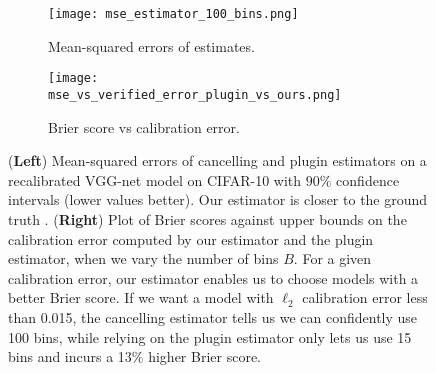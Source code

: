 \begin{figure}
  \centering
  \centering
     \begin{subfigure}[b]{0.45\textwidth}
         \centering
         \texttt{[image: mse\_estimator\_100\_bins.png]}
         \caption{Mean-squared errors of estimates.
         }
         \label{fig:mse_estimators}
     \end{subfigure}
     \hfill
     \begin{subfigure}[b]{0.45\textwidth}
         \centering
         \texttt{[image: mse\_vs\_verified\_error\_plugin\_vs\_ours.png]}
         \caption{Brier score vs calibration error.
         }
         \label{fig:mse_vs_ce_estimators}
     \end{subfigure}
  \caption{
    (\textbf{Left}) Mean-squared errors of cancelling and plugin estimators on a recalibrated VGG-net model on CIFAR-10 with $90\%$ confidence intervals (lower values better). Our estimator is closer to the ground truth .
  (\textbf{Right}) Plot of Brier scores against upper bounds  on the calibration error computed by our estimator and the plugin estimator, when we vary the number of bins $B$. For a given calibration error, our estimator enables us to choose models with a better Brier score. If we want a model with $\ell_2$ calibration error less than 0.015, the cancelling estimator tells us we can confidently use 100 bins, while relying on the plugin estimator only lets us use 15 bins and incurs a 13\% higher Brier score.
}
  \label{fig:mse_estimators_bins}
\end{figure}



